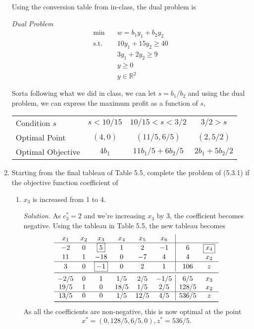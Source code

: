 \documentclass{homework}
\newcommand{\st}{\mathrm{s.t.}}
\newcommand{\solution}{	\vspace{1em} \textit{Solution.} \quad }
\newcommand{\bolditem}[1][YYY]{\item[\textbf{#1}]}
\begin{document}
\begin{enumerate}
			Using the conversion table from in-class, the dual problem is \begin{tcolorbox}
				\textit{Dual Problem} \begin{align*}
					\min \quad & w = b_1 y_1 + b_2 y_2 \\
					\st \quad & 10y_1 + 15 y_2 \ge 40 \\
						& 3 y_1 + 2 y_2 \ge 9 \\
						& y \ge 0 \\
						& y \in \mathbb{R}^2
				\end{align*}
			\end{tcolorbox}
			
			Sorta following what we did in class, we can let $s=b_1/b_2$ and using the dual problem, we can express the maximum profit as a function of $s$, \begin{center}
				\begin{tabular}{lccc}
					\toprule 
					Condition $s$ & $ s< 10/15$ & $10/15 < s < 3/2$ & $3/2 > s$ \\
					Optimal Point & $(4, 0)$ & $(11/5, 6/5) $ & $(2, 5/2)$ \\
					Optimal Objective & $4b_1$ & $11b_1 / 5 + 6b_2/5$ & $2b_1 + 5b_2/2$ \\
					\bottomrule
				\end{tabular}
			\end{center}
		
		\bolditem[5.3.3] Starting from the final tableau of Table 5.5, complete the problem of (5.3.1) if the objective function coefficient of \begin{enumerate}
			\item $x_3$ is increased from 1 to 4.
				
				\solution As $c_3^* = 2$ and we're increasing $x_3$ by $3$, the coefficient becomes negative. Using the tableau in Table 5.5, the new tableau becomes \begin{align*}
					\begin{array}{cccccc|cc}
						x_1 & x_2 & x_3 & x_4 & x_5 & x_6 & &  \\
						\hline
						-2 & 0 & \boxed{5} & 1 & 2 & -1 & 6 & \boxed{x_4} \\
						11 & 1 & -18 & 0 & -7 & 4 & 4 & x_2 \\
						\hline
						3 & 0 & \boxed{-1} & 0 & 2 & 1 & 106 & z \\
						\midrule
						-2/5 & 0 & 1 & 1/5 & 2/5 & -1/5 & 6/5 & x_3 \\
						19/5 & 1 & 0 & 18/5 & 1/5 & 2/5 & 128/5 & x_2 \\
						\hline
						13/5 & 0 & 0 & 1/5 & 12/5 & 4/5 & 536/5 & z \\
						\bottomrule
					\end{array}
				\end{align*}
				As all the coefficients are non-negative, this is now optimal at the point  $$\boxed{x^* = (0, 128/5, 6/5, 0), z^* = 536/5.}$$
				

\end{enumerate}
\end{enumerate}
\end{document}
